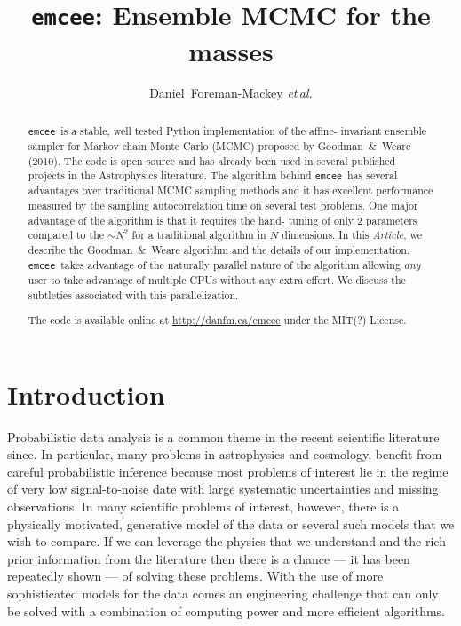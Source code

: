 \documentclass[12pt,preprint]{aastex}
\newcommand{\project}[1]{\texttt{#1}}
\newcommand{\thisplain}{emcee}
\newcommand{\this}{\project{\thisplain}}
\newcommand{\paper}{\emph{Article}}
\newcommand{\license}{MIT(?) License}
\newcommand{\foreign}[1]{\emph{#1}}
\newcommand{\etal}{\foreign{et\,al.}}
\begin{document}
\title{\this: Ensemble MCMC for the masses}
\author{Daniel~Foreman-Mackey \etal}

\begin{abstract}

    \this~is a stable, well tested Python implementation of the affine-%
    invariant ensemble sampler for Markov chain Monte Carlo (MCMC)
    proposed by Goodman~\&~Weare (2010). The code is open source and has
    already been used in several published projects in the Astrophysics
    literature. The algorithm behind \this~has several advantages over
    traditional MCMC sampling methods and it has excellent performance
    measured by the sampling autocorrelation time on several test problems.
    One major advantage of the algorithm is that it requires the hand-%
    tuning of only 2 parameters compared to the $\sim N^2$ for
    a traditional algorithm in $N$ dimensions. In this \paper, we describe
    the Goodman~\&~Weare algorithm and the details of our implementation.
    \this~takes advantage of the naturally parallel nature of the algorithm
    allowing \emph{any} user to take advantage of multiple CPUs without any
    extra effort. We discuss the subtleties associated with this
    parallelization.

    The code is available online at \url{http://danfm.ca/\thisplain} under the
    \license.

\end{abstract}


\section{Introduction}

Probabilistic data analysis is a common theme in the recent scientific
literature since. In particular, many problems in astrophysics and cosmology,
benefit from careful probabilistic inference because most problems of
interest lie in the regime of very low signal-to-noise date with large
systematic uncertainties and missing observations. In many scientific
problems of interest, however, there is a physically motivated,
generative model of the data or several
such models that we wish to compare. If we can leverage the physics that we
understand and the rich prior information from the literature then there is
a chance --- it has been repeatedly shown --- of solving these problems.
With the use of more sophisticated models for the data comes an engineering
challenge that can only be solved with a combination of computing power and
more efficient algorithms.
\end{document}
